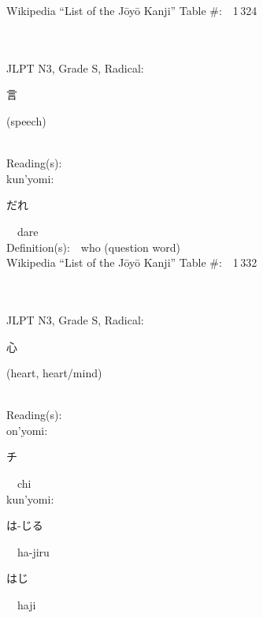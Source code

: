 \begin{multicols}{2}
Wikipedia ``List of the J\=oy\=o Kanji'' Table \#:\ \ 1\,324 \\
\ \ \\
{\fontsize{34pt}{40pt}  }\ \ \\  %
{JLPT N3, Grade S, Radical:\ \ {\begin{CJK}{UTF8}{min} 言 \end{CJK}} (speech) } \\
Reading(s):\ \ \\
{\hspace*{1em}}kun'yomi:\ \ \\
{\hspace*{2em}}{\begin{CJK}{UTF8}{min} だれ \end{CJK}}\ \ dare\ \ \\
Definition(s):\ \ who (question word) \\
Wikipedia ``List of the J\=oy\=o Kanji'' Table \#:\ \ 1\,332 \\
\ \ \\
{\fontsize{34pt}{40pt}  }\ \ \\  %
{JLPT N3, Grade S, Radical:\ \ {\begin{CJK}{UTF8}{min} 心 \end{CJK}} (heart, heart/mind) } \\
Reading(s):\ \ \\
{\hspace*{1em}}on'yomi:\ \ \\
{\hspace*{2em}}{\begin{CJK}{UTF8}{min} チ \end{CJK}}\ \ chi\ \ \\
{\hspace*{1em}}kun'yomi:\ \ \\
{\hspace*{2em}}{\begin{CJK}{UTF8}{min} は-じる \end{CJK}}\ \ ha-jiru\ \ \\
{\hspace*{2em}}{\begin{CJK}{UTF8}{min} はじ \end{CJK}}\ \ haji\ \ \\

\end{multicols}
